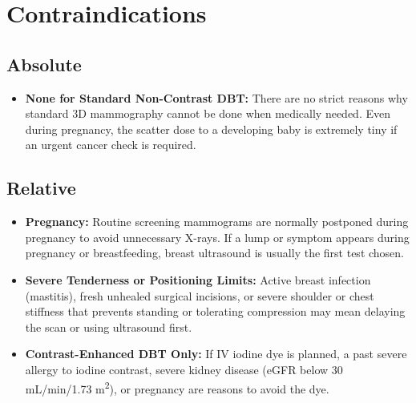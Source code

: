 \section{Contraindications}

\subsection{Absolute}
\begin{itemize}
\item \textbf{None for Standard Non-Contrast DBT:} There are no strict reasons why standard 3D mammography cannot be done when medically needed. Even during pregnancy, the scatter dose to a developing baby is extremely tiny if an urgent cancer check is required.
\end{itemize}

\subsection{Relative}
\begin{itemize}
\item \textbf{Pregnancy:} Routine screening mammograms are normally postponed during pregnancy to avoid unnecessary X-rays. If a lump or symptom appears during pregnancy or breastfeeding, breast ultrasound is usually the first test chosen.
\item \textbf{Severe Tenderness or Positioning Limits:} Active breast infection (mastitis), fresh unhealed surgical incisions, or severe shoulder or chest stiffness that prevents standing or tolerating compression may mean delaying the scan or using ultrasound first.
\item \textbf{Contrast-Enhanced DBT Only:} If IV iodine dye is planned, a past severe allergy to iodine contrast, severe kidney disease (eGFR below 30 mL/min/1.73 m\textsuperscript{2}), or pregnancy are reasons to avoid the dye.
\end{itemize}

